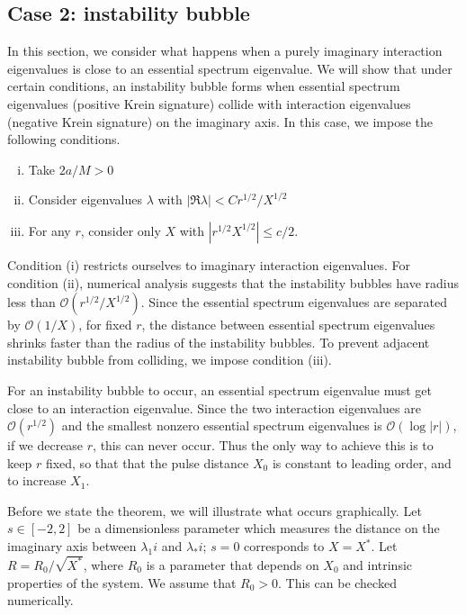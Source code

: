 \documentclass[thesis.tex]{subfiles}
\begin{document}
\subsection{Case 2: instability bubble}\label{section:2perbubble}

In this section, we consider what happens when a purely imaginary interaction eigenvalues is close to an essential spectrum eigenvalue. We will show that under certain conditions, an instability bubble forms when essential spectrum eigenvalues (positive Krein signature) collide with interaction eigenvalues (negative Krein signature) on the imaginary axis. In this case, we impose the following conditions.

\begin{enumerate}[(i)]
	\item Take $2a/M > 0$
	\item Consider eigenvalues $\lambda$ with $|\Re \lambda| < C r^{1/2}/X^{1/2}$
	\item For any $r$, consider only $X$ with
	$\left| r^{1/2} X^{1/2} \right| \leq c/2$. 
	\end{enumerate}

Condition (i) restricts ourselves to imaginary interaction eigenvalues. For condition (ii), numerical analysis suggests that the instability bubbles have radius less than $\mathcal{O}(r^{1/2}/X^{1/2})$. Since the essential spectrum eigenvalues are separated by $\mathcal{O}(1/X)$, for fixed $r$, the distance between essential spectrum eigenvalues shrinks faster than the radius of the instability bubbles. To prevent adjacent instability bubble from colliding, we impose condition (iii).

For an instability bubble to occur, an essential spectrum eigenvalue must get close to an interaction eigenvalue. Since the two interaction eigenvalues are $\mathcal{O}(r^{1/2})$ and the smallest nonzero essential spectrum eigenvalues is $\mathcal{O}(\log|r|)$, if we decrease $r$, this can never occur. Thus the only way to achieve this is to keep $r$ fixed, so that that the pulse distance $X_0$ is constant to leading order, and to increase $X_1$.

Before we state the theorem, we will illustrate what occurs graphically. Let $s \in [-2, 2]$ be a dimensionless parameter which measures the distance on the imaginary axis between $\lambda_1 i$ and $\lambda_* i$; $s = 0$ corresponds to $X = X^*$. Let $R = R_0 / \sqrt{X^*}$, where $R_0$ is a parameter that depends on $X_0$ and intrinsic properties of the system. We assume that $R_0 > 0$. This can be checked numerically.
\end{document}
